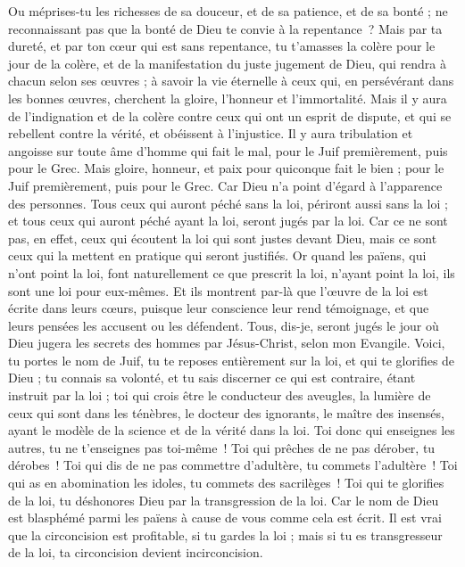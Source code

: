 \begin{multicols}{2}
Ou méprises-tu les richesses de sa douceur, et de sa patience, et de sa bonté ; ne reconnaissant pas que la bonté de Dieu te convie à la repentance ?
Mais par ta dureté, et par ton cœur qui est sans repentance, tu t'amasses la colère pour le jour de la colère, et de la manifestation du juste jugement de Dieu,
qui rendra à chacun selon ses œuvres ;
à savoir la vie éternelle à ceux qui, en persévérant dans les bonnes œuvres, cherchent la gloire, l'honneur et l'immortalité.
Mais il y aura de l'indignation et de la colère contre ceux qui ont un esprit de dispute, et qui se rebellent contre la vérité, et obéissent à l'injustice.
Il y aura tribulation et angoisse sur toute âme d'homme qui fait le mal, pour le Juif premièrement, puis pour le Grec.
Mais gloire, honneur, et paix pour quiconque fait le bien ; pour le Juif premièrement, puis pour le Grec.
Car Dieu n'a point d'égard à l'apparence des personnes.
Tous ceux qui auront péché sans la loi, périront aussi sans la loi ; et tous ceux qui auront péché ayant la loi, seront jugés par la loi.
Car ce ne sont pas, en effet, ceux qui écoutent la loi qui sont justes devant Dieu, mais ce sont ceux qui la mettent en pratique qui seront justifiés.
Or quand les païens, qui n'ont point la loi, font naturellement ce que prescrit la loi, n'ayant point la loi, ils sont une loi pour eux-mêmes.
Et ils montrent par-là que l’œuvre de la loi est écrite dans leurs cœurs, puisque leur conscience leur rend témoignage, et que leurs pensées les accusent ou les défendent.
Tous, dis-je, seront jugés le jour où Dieu jugera les secrets des hommes par Jésus-Christ, selon mon Evangile.
Voici, tu portes le nom de Juif, tu te reposes entièrement sur la loi, et qui te glorifies de Dieu ;
tu connais sa volonté, et tu sais discerner ce qui est contraire, étant instruit par la loi ; toi qui crois être le conducteur des aveugles, la lumière de ceux qui sont dans les ténèbres,
le docteur des ignorants, le maître des insensés, ayant le modèle de la science et de la vérité dans la loi.
Toi donc qui enseignes les autres, tu ne t’enseignes pas toi-même ! Toi qui prêches de ne pas dérober, tu dérobes !
Toi qui dis de ne pas commettre d’adultère, tu commets l’adultère ! Toi qui as en abomination les idoles, tu commets des sacrilèges !
Toi qui te glorifies de la loi, tu déshonores Dieu par la transgression de la loi.
Car le nom de Dieu est blasphémé parmi les païens à cause de vous comme cela est écrit.
Il est vrai que la circoncision est profitable, si tu gardes la loi ; mais si tu es transgresseur de la loi, ta circoncision devient incirconcision.

\end{multicols}
